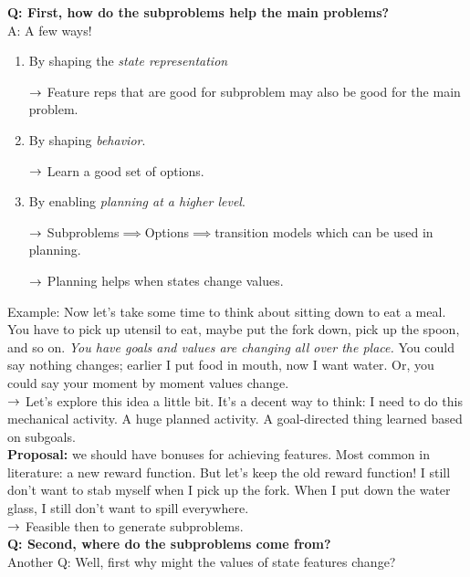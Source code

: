 {\bf Q: First, how do the subproblems help the main problems?} \\

A: A few ways!

\begin{enumerate}
    \item By shaping the {\it state representation}
    
    $\rightarrow$ Feature reps that are good for subproblem may also be good for the main problem.
    
    \item By shaping {\it behavior}.
    
    $\rightarrow$ Learn a good set of options.
    
    \item By enabling {\it planning at a higher level}.
    
    $\rightarrow$ Subproblems$\implies$Options$\implies$transition models which can be used in planning.
    
    $\rightarrow$ Planning helps when states change values.
\end{enumerate}

Example: Now let's take some time to think about sitting down to eat a meal. You have to pick up utensil to eat, maybe put the fork down, pick up the spoon, and so on. {\it You have goals and values are changing all over the place.} You could say nothing changes; earlier I put food in mouth, now I want water. Or, you could say your moment by moment values change. \\

$\rightarrow$ Let's explore this idea a little bit. It's a decent way to think: I need to do this mechanical activity. A huge planned activity. A goal-directed thing learned based on subgoals. \\

{\bf Proposal:} we should have bonuses for achieving features. Most common in literature: a new reward function. But let's keep the old reward function! I still don't want to stab myself when I pick up the fork. When I put down the water glass, I still don't want to spill everywhere. \\

$\rightarrow$ Feasible then to generate subproblems. \\

{\bf Q: Second, where do the subproblems come from?} \\

Another Q: Well, first why might the values of state features change? \\

